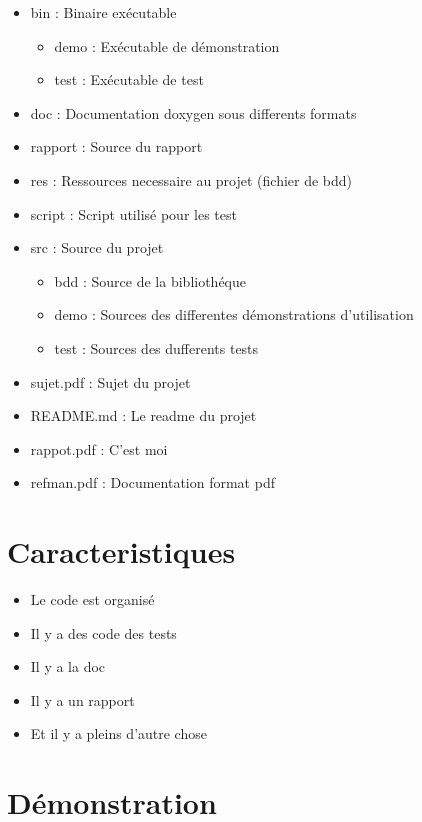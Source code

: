\documentclass[a4paper]{article}
\begin{document}
\begin{itemize}
\item bin : Binaire exécutable
\begin{itemize}
  \item demo : Exécutable de démonstration
  \item test : Exécutable de test
\end{itemize}
\item doc : Documentation doxygen sous differents formats
\item rapport : Source du rapport
\item res : Ressources necessaire au projet (fichier de bdd)
\item script  : Script utilisé pour les test
\item src : Source du projet
\begin{itemize}
  \item bdd   : Source de la bibliothéque
  \item demo  : Sources des differentes démonstrations d'utilisation
  \item test  : Sources des dufferents tests
\end{itemize}

\item sujet.pdf  : Sujet du projet
\item README.md  : Le readme du projet 
\item rappot.pdf : C'est moi
\item refman.pdf : Documentation format pdf
\end{itemize}

\section{Caracteristiques}

\begin{itemize}
	\item Le code est organisé
	\item Il y a des code des tests
	\item Il y a la doc
	\item Il y a un rapport
	\item Et il y a pleins d'autre chose
\end{itemize}

\section{Démonstration}
\end{document}
